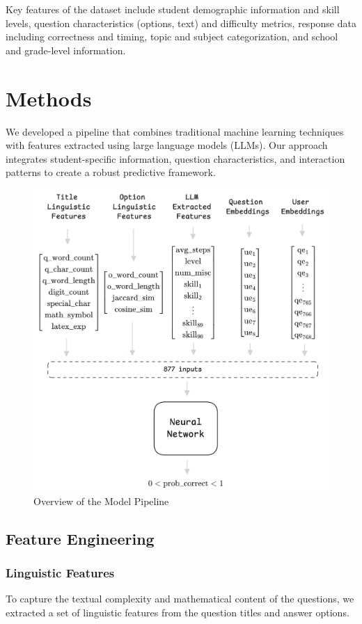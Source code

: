 \documentclass[11pt]{article}
\begin{document}
Key features of the dataset include student demographic information and skill levels, question characteristics (options, text) and difficulty metrics, response data including correctness and timing, topic and subject categorization, and school and grade-level information.

\section{Methods}

We developed a pipeline that combines traditional machine learning techniques with features extracted using large language models (LLMs). Our approach integrates student-specific information, question characteristics, and interaction patterns to create a robust predictive framework.

\begin{figure}[H]
    \centering
    \includegraphics[width=0.8\columnwidth]{images/model_diagram.png}
    \caption{Overview of the Model Pipeline}
    \label{fig:model-pipeline}
\end{figure}

\subsection{Feature Engineering}

\subsubsection{Linguistic Features}
To capture the textual complexity and mathematical content of the questions, we extracted a set of linguistic features from the question titles and answer options.
\end{document}
